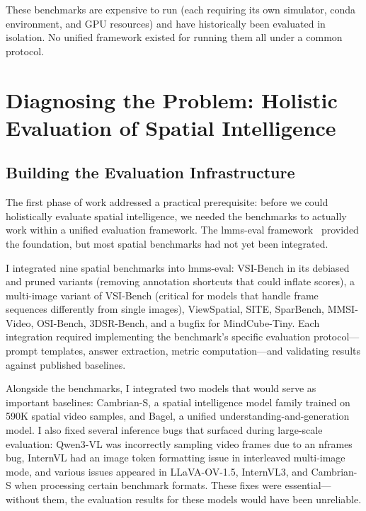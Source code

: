 \documentclass[
hf,
]{confart}
\begin{document}
These benchmarks are expensive to run (each requiring its own simulator, conda environment, and GPU resources) and have historically been evaluated in isolation. No unified framework existed for running them all under a common protocol.


\section{Diagnosing the Problem: Holistic Evaluation of Spatial Intelligence}
\label{sec:diagnosis}

\subsection{Building the Evaluation Infrastructure}

The first phase of work addressed a practical prerequisite: before we could holistically evaluate spatial intelligence, we needed the benchmarks to actually work within a unified evaluation framework. The lmms-eval framework~\cite{Zhang_2025} provided the foundation, but most spatial benchmarks had not yet been integrated.

I integrated nine spatial benchmarks into lmms-eval: VSI-Bench in its debiased and pruned variants (removing annotation shortcuts that could inflate scores), a multi-image variant of VSI-Bench (critical for models that handle frame sequences differently from single images), ViewSpatial, SITE, SparBench, MMSI-Video, OSI-Bench, 3DSR-Bench, and a bugfix for MindCube-Tiny. Each integration required implementing the benchmark's specific evaluation protocol---prompt templates, answer extraction, metric computation---and validating results against published baselines.

Alongside the benchmarks, I integrated two models that would serve as important baselines: Cambrian-S, a spatial intelligence model family trained on 590K spatial video samples, and Bagel, a unified understanding-and-generation model. I also fixed several inference bugs that surfaced during large-scale evaluation: Qwen3-VL was incorrectly sampling video frames due to an nframes bug, InternVL had an image token formatting issue in interleaved multi-image mode, and various issues appeared in LLaVA-OV-1.5, InternVL3, and Cambrian-S when processing certain benchmark formats. These fixes were essential---without them, the evaluation results for these models would have been unreliable.
\end{document}
